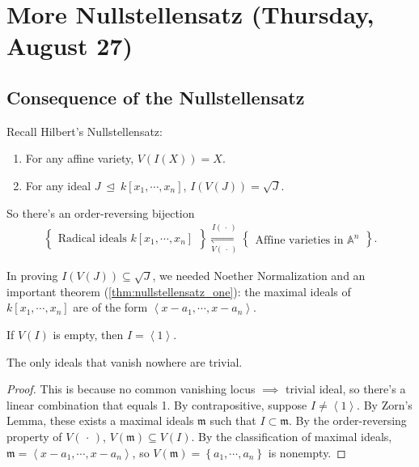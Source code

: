 \hypertarget{more-nullstellensatz-thursday-august-27}{%
\section{More Nullstellensatz (Thursday, August
27)}\label{more-nullstellensatz-thursday-august-27}}

\hypertarget{consequence-of-the-nullstellensatz}{%
\subsection{Consequence of the
Nullstellensatz}\label{consequence-of-the-nullstellensatz}}

Recall Hilbert's Nullstellensatz:

\begin{enumerate}
\def\labelenumi{\alph{enumi}.}
\item
  For any affine variety, \(V(I(X)) = X\).
\item
  For any ideal \(J{~\trianglelefteq~}k[x_1, \cdots, x_n]\),
  \(I(V(J)) = \sqrt{J}\).
\end{enumerate}

So there's an order-reversing bijection
\begin{align*}  
\left\{{\substack{\text{Radical ideals } k[x_1, \cdots, x_n]}}\right\} 
\mathrel{\operatorname*{\rightleftharpoons}_{V({\,\cdot\,})}^{I({\,\cdot\,})}}
\left\{{\substack{\text{Affine varieties in } {\mathbb{A}}^n}}\right\}
.\end{align*}

In proving \(I(V(J)) \subseteq \sqrt{J}\), we needed Noether
Normalization and an important theorem (\cref{thm:nullstellensatz_one}):
the maximal ideals of \(k[x_1, \cdots, x_n]\) are of the form
\(\left\langle{x-a_1, \cdots, x-a_n}\right\rangle\).

\begin{corollary}[?]

If \(V(I)\) is empty, then \(I = \left\langle{1}\right\rangle\).

\end{corollary}

\begin{slogan}

The only ideals that vanish nowhere are trivial.

\end{slogan}

\begin{proof}

This is because no common vanishing locus \(\implies\) trivial ideal, so
there's a linear combination that equals 1. By contrapositive, suppose
\(I\neq \left\langle{1}\right\rangle\). By Zorn's Lemma, these exists a
maximal ideals \({\mathfrak{m}}\) such that
\(I \subset {\mathfrak{m}}\). By the order-reversing property of
\(V({\,\cdot\,})\), \(V({\mathfrak{m}}) \subseteq V(I)\). By the
classification of maximal ideals,
\({\mathfrak{m}}= \left\langle{x-a_1, \cdots, x-a_n}\right\rangle\), so
\(V({\mathfrak{m}}) = \left\{{a_1, \cdots, a_n}\right\}\) is nonempty.

\end{proof}

